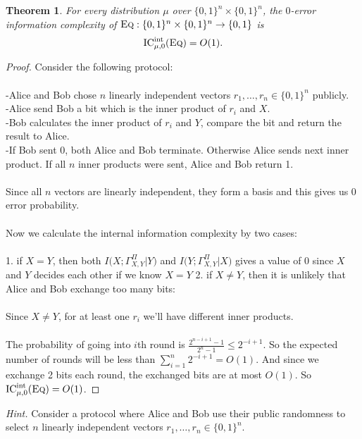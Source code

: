 \documentclass[11pt,oneside]{book}
\theoremstyle{plain}
\newtheorem{theorem}{Theorem}
\theoremstyle{definition}
\theoremstyle{plain}
\newcommand{\Eq}{\textsc{Eq}}
\newcommand{\ICint}{\mathrm{IC}^{\mathrm{int}}}
\begin{document}
\begin{theorem}
	For every distribution $\mu$ over $\{0,1\}^n \times \{0,1\}^n$, the $0$-error information complexity of $\Eq : \{0,1\}^n \times \{0,1\}^n \to \{0,1\}$ is 
	\[
	\ICint_{\mu,0}(\Eq) = O(1).
	\]
\end{theorem}

\begin{proof}
	Consider the following protocol:\\
	\\
	-Alice and Bob chose $n$ linearly independent vectors $r_1,\ldots,r_n \in \{0,1\}^n$ publicly.\\
	-Alice send Bob a bit which is the inner product of $r_i$ and $X$.\\
	-Bob calculates the inner product of $r_i$ and $Y$, compare the bit and return the result to Alice.\\
	-If Bob sent 0, both Alice and Bob terminate. Otherwise Alice sends next inner product. If all $n$ inner products were sent, Alice and Bob return 1.\\
	\\
	Since all $n$ vectors are linearly independent, they form a basis and this gives us $0$ error probability.\\
	\\
	Now we calculate the internal information complexity by two cases:\\
	\\
	1. if $X=Y$, then both $I\big( X ; \Gamma_{X,Y}^\Pi|Y\big)$ and $I\big( Y ; \Gamma_{X,Y}^\Pi|X\big)$ gives a value of 0 since $X$ and $Y$ decides each other if we know $X=Y$
	2. if $X \neq Y$, then it is unlikely that Alice and Bob exchange too many bits: \\
	\\
	Since $X \neq Y$, for at least one $r_i$ we'll have different inner products. \\
	\\
	The probability of going into $i$th round is $\frac{2^{n-i+1}-1}{2^n-1}\leq2^{-i+1}$. So the expected number of rounds will be  less than $\sum_{i=1}^{n}2^{-i+1}=O(1)$. And since we exchange 2 bits each round, the exchanged bits are at most $O(1)$. So $\ICint_{\mu,0}(\Eq) = O(1)$.
\end{proof}

\bigskip
\noindent \emph{Hint.} Consider a protocol where Alice and Bob use their public randomness to select $n$ linearly independent vectors $r_1,\ldots,r_n \in \{0,1\}^n$.
\end{document}
